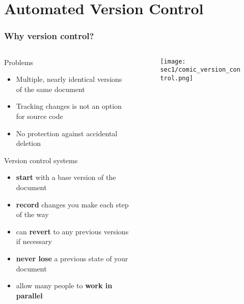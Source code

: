 \section{Automated Version Control}\hypertarget{sec1}{}

\begin{frame}[fragile]
\frametitle{Why version control?}

  \begin{columns}

    \begin{column}{0.6\textwidth}
      Problems
      \begin{itemize}
        \small
        \item Multiple, nearly identical versions of the same document
        \item Tracking changes is not an option for source code
        \item No protection against accidental deletion
      \end{itemize}
      \vspace{0.15cm}
      Version control systems 
      \begin{itemize}
        \small
        \item {\bf start} with a base version of the document
        \item {\bf record} changes you make each step of the way
        \item can {\bf revert} to any previous versions if necessary
        \item {\bf never lose} a previous state of your document
        \item allow many people to {\bf work in parallel}
      \end{itemize}
    \end{column}

    \begin{column}{0.4\textwidth}
    \begin{figure}[h]
    \texttt{[image: sec1/comic\_version\_control.png]}
    \end{figure}
    \end{column}

  \end{columns}

\end{frame}

